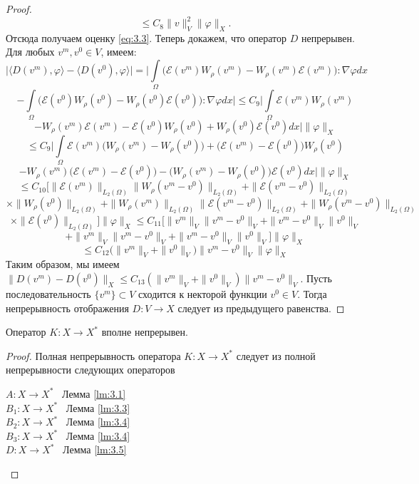 \begin{proof}
    $$\leqslant C_8\| v\|^2_V\|\varphi\|_X.$$
    Отсюда получаем оценку \ref{eq:3.3}.
    Теперь докажем, что оператор $D$ непрерывен. Для любых $v^m,v^0\in V$, имеем:
    $$\bigg|\langle D(v^m),\varphi\rangle-\langle D(v^0),\varphi\rangle\bigg|=\bigg|\int\limits_{\Omega}\bigg(\mathcal{E}(v^m)W_{\rho}(v^m)-W_{\rho}(v^m)\mathcal{E}(v^m)\bigg):\nabla\varphi dx$$
    $$-\int\limits_{\Omega}\bigg(\mathcal{E}(v^0)W_{\rho}(v^0)-W_{\rho}(v^0)\mathcal{E}(v^0)\bigg):\nabla\varphi dx\bigg|\leqslant C_9\bigg|\int\limits_{\Omega}\mathcal{E}(v^m)W_{\rho}(v^m)$$
    $$-W_{\rho}(v^m)\mathcal{E}(v^m)-\mathcal{E}(v^0)W_{\rho}(v^0)+W_{\rho}(v^0)\mathcal{E}(v^0)dx\bigg|\|\varphi\|_X$$
    $$\leqslant C_9\bigg|\int\limits_{\Omega}\mathcal{E}(v^m)\bigg(W_{\rho}(v^m)-W_{\rho}(v^0)\bigg)+\bigg(\mathcal{E}(v^m)-\mathcal{E}(v^0)\bigg)W_{\rho}(v^0)$$
    $$-W_{\rho}(v^m)\bigg(\mathcal{E}(v^m)-\mathcal{E}(v^0)\bigg)-\bigg(W_{\rho}(v^m)-W_{\rho}(v^0)\bigg)\mathcal{E}(v^0)dx\bigg|\|\varphi\|_X$$
    $$\leqslant C_{10}\bigg[\|\mathcal{E}(v^m)\|_{L_2(\Omega)}\|W_{\rho}(v^m-v^0)\|_{L_2(\Omega)}+\|\mathcal{E}(v^m-v^0)\|_{L_2(\Omega)}$$
    $$\times\|W_{\rho}(v^0)\|_{L_2(\Omega)}+\|W_{\rho}(v^m)\|_{L_2(\Omega)}\|\mathcal{E}(v^m-v^0)\|_{L_2(\Omega)}+\|W_{\rho}(v^m-v^0)\|_{L_2(\Omega)}$$
    $$\times\|\mathcal{E}(v^0)\|_{L_2(\Omega)}\bigg]\|\varphi\|_X\leqslant C_{11}\bigg[\|v^m\|_V\|v^m-v^0\|_V+\|v^m-v^0\|_V\|v^0\|_V$$
    $$+\|v^m\|_V\|v^m-v^0\|_V+\|v^m-v^0\|_V\|v^0\|_V\bigg]\|\varphi\|_X$$
    $$\leqslant C_{12}\bigg(\|v^m\|_V+\|v^0\|_V\bigg)\|v^m-v^0\|_V\|\varphi\|_X$$
    Таким образом, мы имеем $\|D(v^m)-D(v^0)\|_X\leqslant C_{13}(\|v^m\|_V+\|v^0\|_V)\|v^m-v^0\|_V$.
    Пусть последовательность $\{v^m\}\subset V$ сходится к некторой функции $v^0\in V$. Тогда непрерывность отображения $D:V\rightarrow X$
    следует из предыдущего равенства.
\end{proof}

\begin{lemma}\label{lm:3.6}
    Оператор $K:X\rightarrow X^*$ вполне непрерывен.
\end{lemma}

\begin{proof}
    Полная непрерывность оператора $K:X\rightarrow X^*$ следует из полной непрерывности следующих операторов
    \begin{center}
        $A:X\rightarrow X^*$ \ Лемма \ref{lm:3.1} \\
        $B_1:X\rightarrow X^*$ \ Лемма \ref{lm:3.3} \\
        $B_2:X\rightarrow X^*$ \ Лемма \ref{lm:3.4} \\
        $B_3:X\rightarrow X^*$ \ Лемма \ref{lm:3.4} \\
        $D:X\rightarrow X^*$ \ Лемма \ref{lm:3.5} \\
    \end{center}
\end{proof}


